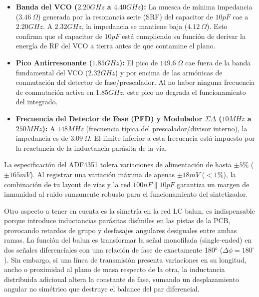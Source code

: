 \documentclass[11pt,a4paper,twoside]{report}
\begin{document}
	\begin{itemize}
		\item \textbf{Banda del VCO ($2.20GHz$ a $4.40GHz$):} La muesca de mínima impedancia ($3.46\ \Omega$) generada por la resonancia serie (SRF) del capacitor de $10pF$ cae a $2.20GHz$. A $2.32GHz$, la impedancia se mantiene baja ($4.12\ \Omega$). Esto confirma que el capacitor de $10pF$ está cumpliendo su función de derivar la energía de RF del VCO a tierra antes de que contamine el plano.\newpage
		
		\item \textbf{Pico Antirresonante ($1.85GHz$):} El pico de $149.6\ \Omega$ cae fuera de la banda fundamental del VCO ($2.32GHz$) y por encima de las armónicas de conmutación del detector de fase/prescalador. Al no haber ninguna frecuencia de conmutación activa en $1.85GHz$, este pico no degrada el funcionamiento del integrado.
		
		\item \textbf{Frecuencia del Detector de Fase (PFD) y Modulador $\Sigma\Delta$ ($10 MHz$ a $250MHz$):} A $148MHz$ (frecuencia típica del prescalador/divisor interno), la impedancia es de $3.09\ \Omega$. El límite inferior a esta frecuencia está impuesto por la reactancia de la inductancia parásita de la vía.
	\end{itemize}
	
	La especificación del ADF4351 tolera variaciones de alimentación de hasta $\pm 5\%$ ($\pm 165mV$). Al registrar una variación máxima de apenas $\pm 18mV$ ($< 1\%$), la combinación de tu layout de vías y la red $100nF \parallel 10pF$ garantiza un margen de inmunidad al ruido sumamente robusto para el funcionamiento del sintetizador.\newline
	
	Otro aspecto a tener en cuenta es la simetría en la red LC balun, es indispensable porque introduce inductancias parásitas disímiles en las pistas de la PCB, provocando retardos de grupo y desfasajes angulares desiguales entre ambas ramas. La función del balun es transformar la señal monofilada (single-ended) en dos señales diferenciales con una relación de fase de exactamente 180° ($\Delta \phi = 180^\circ$). Sin embargo, si una línea de transmisión presenta variaciones en su longitud, ancho o proximidad al plano de masa respecto de la otra, la inductancia distribuida adicional altera la constante de fase, sumando un desplazamiento angular no simétrico que destruye el balance del par diferencial.\newline
	
\end{document}

